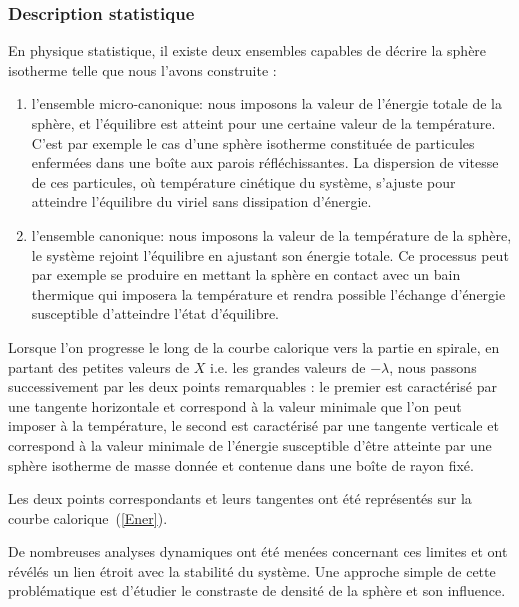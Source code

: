 \subsubsection{Description statistique}
	En physique statistique, il existe deux ensembles capables de décrire la sphère isotherme telle que nous l'avons construite :
	\begin{enumerate}

		\item l'ensemble micro-canonique: nous imposons la valeur de l'énergie totale de la sphère, et
			l'équilibre est atteint pour une certaine valeur de la température. C'est par exemple le cas
			d'une sphère isotherme constituée de particules enfermées dans une boîte aux parois
			réfléchissantes. La dispersion de vitesse de ces particules, où température cinétique du
			système, s'ajuste pour atteindre l'équilibre du viriel sans dissipation d'énergie.
		
		\item l'ensemble canonique: nous imposons la valeur de la température de la sphère, le système rejoint
			l'équilibre en ajustant son énergie totale. Ce processus peut par exemple se produire en mettant
			la sphère en contact avec un bain thermique qui imposera la température et rendra possible
			l'échange d'énergie susceptible d'atteindre l'état d'équilibre.
		
	\end{enumerate}

	Lorsque l'on progresse le long de la courbe calorique vers la partie en spirale, en partant des petites valeurs
	de $X$ i.e. les grandes valeurs de $-\lambda$, nous passons successivement par les deux points remarquables : le
	premier est caractérisé par une tangente horizontale et correspond à la valeur minimale que l'on peut imposer à
	la température, le second est caractérisé par une tangente verticale et correspond à la valeur minimale de
	l'énergie susceptible d'être atteinte par une sphère isotherme de masse donnée et contenue dans une boîte de
	rayon fixé.
	
	Les deux points correspondants et leurs tangentes ont été représentés sur la courbe calorique~(\ref{Ener}).
	
	De nombreuses analyses dynamiques ont été menées concernant ces limites et ont révélés un lien étroit avec la stabilité du système. Une approche simple de cette problématique est d'étudier le constraste de densité de la sphère et son influence.
	
